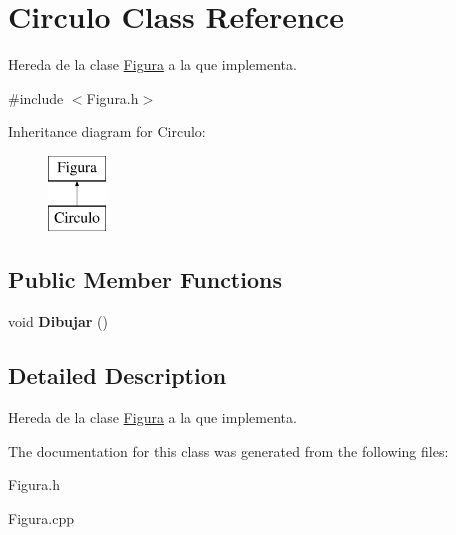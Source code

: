 \hypertarget{class_circulo}{\section{Circulo Class Reference}
\label{class_circulo}
}


Hereda de la clase \hyperlink{class_figura}{Figura} a la que implementa.  




{\ttfamily \#include $<$Figura.\-h$>$}

Inheritance diagram for Circulo\-:\begin{figure}[H]
\begin{center}
\leavevmode
\includegraphics[height=2.000000cm]{class_circulo}
\end{center}
\end{figure}
\subsection*{Public Member Functions}
\begin{DoxyCompactItemize}
\item 
\hypertarget{class_circulo_af3ccceb1a63325ecc88fbb232ab454a8}{void {\bfseries Dibujar} ()}\label{class_circulo_af3ccceb1a63325ecc88fbb232ab454a8}

\end{DoxyCompactItemize}


\subsection{Detailed Description}
Hereda de la clase \hyperlink{class_figura}{Figura} a la que implementa. 

The documentation for this class was generated from the following files\-:\begin{DoxyCompactItemize}
\item 
Figura.\-h\item 
Figura.\-cpp\end{DoxyCompactItemize}
